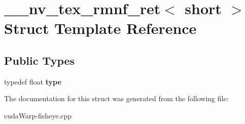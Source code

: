 \hypertarget{struct____nv__tex__rmnf__ret_3_01short_01_4}{}\section{\+\_\+\+\_\+nv\+\_\+tex\+\_\+rmnf\+\_\+ret$<$ short $>$ Struct Template Reference}
\label{struct____nv__tex__rmnf__ret_3_01short_01_4}
\subsection*{Public Types}
\begin{DoxyCompactItemize}
\item 
typedef float {\bfseries type}\hypertarget{struct____nv__tex__rmnf__ret_3_01short_01_4_a231a7aab15f7b29ce0d5aa437011908c}{}\label{struct____nv__tex__rmnf__ret_3_01short_01_4_a231a7aab15f7b29ce0d5aa437011908c}

\end{DoxyCompactItemize}


The documentation for this struct was generated from the following file\+:\begin{DoxyCompactItemize}
\item 
cuda\+Warp-\/fisheye.\+cpp\end{DoxyCompactItemize}
